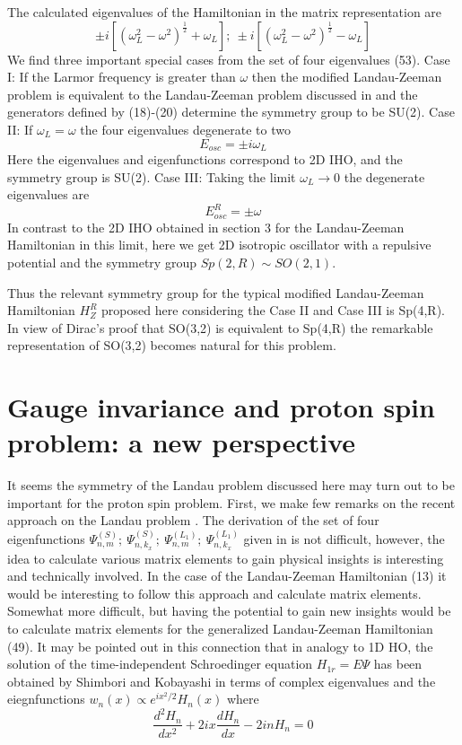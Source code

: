 \documentclass[aps, singlecolumn, showpacs]{revtex4-2}
\begin{document}
The calculated eigenvalues of the Hamiltonian in the matrix representation are
\begin{equation}
\pm i [(\omega_L^2 -\omega^2)^\frac{1}{2} +\omega_L]; ~\pm i [(\omega_L^2 -\omega^2)^\frac{1}{2} -\omega_L]
\end{equation}
We find three important special cases from the set of four eigenvalues (53). Case I: If the Larmor frequency is greater than $\omega$ then the modified Landau-Zeeman problem is equivalent to the Landau-Zeeman problem discussed in \cite{14} and the generators defined by (18)-(20) determine the symmetry group to be SU(2). Case II: If $\omega_L =\omega$ the four eigenvalues degenerate to two
\begin{equation}
E_{osc} =\pm i \omega_L
\end{equation}
Here the eigenvalues and eigenfunctions correspond to 2D IHO, and the symmetry group is SU(2). Case III: Taking the limit $\omega_L \rightarrow 0$ the degenerate eigenvalues are
\begin{equation}
E_{osc}^R =\pm \omega
\end{equation}
In contrast to the  2D IHO obtained in section 3 for the Landau-Zeeman Hamiltonian in this limit, here we get 2D isotropic oscillator with a repulsive potential and the symmetry group $Sp(2,R) \sim SO(2,1)$.

Thus the relevant symmetry group for the typical modified Landau-Zeeman Hamiltonian  $H_Z^R$  proposed here considering the Case II and Case III is Sp(4,R). In view of Dirac's proof that SO(3,2) is equivalent to Sp(4,R) \cite{15} the remarkable representation of SO(3,2) becomes natural for this problem. 


\section{\bf Gauge invariance and proton spin problem: a new perspective}

It seems the symmetry of the Landau problem discussed here may turn out to be important for the proton spin problem. First, we make few remarks on the recent approach on the Landau problem \cite{8}. The derivation of the set of four eigenfunctions  $\Psi^{(S)}_{n,m}; ~ \Psi^{(S)}_{n,k_x}; ~\Psi^{(L_1)}_{n,m}; ~\Psi^{(L_1)}_{n,k_x}$ given in \cite{8} is not difficult, however, the idea to calculate various matrix elements to gain physical insights is interesting and technically involved. In the case of the Landau-Zeeman Hamiltonian (13) it would be interesting to follow this approach and calculate matrix elements. Somewhat more difficult, but having the potential to gain new insights  would be  to calculate matrix elements for the generalized Landau-Zeeman Hamiltonian (49). It may be pointed out in this connection that in analogy to 1D HO, the solution of the time-independent Schroedinger equation $H_{1r} =E \Psi$ has been obtained by Shimbori and Kobayashi \cite{32} in terms of complex eigenvalues and the eiegnfunctions $w_n(x) \propto e^{i x^2/2} H_n(x)$ where
\begin{equation}
\frac{d^2 H_n}{d x^2} +2 i x \frac{d H_n}{d x} -2 i n H_n =0
\end{equation}
\end{document}
